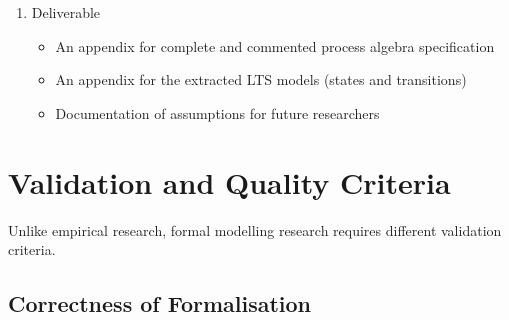 \begin{enumerate}
  Format the complete specification as an appendix with:

  \begin{itemize}
      \item Complete alphabet definition
      \item Complete process algebra terms for \(P_{ICS004}\), \(P_{ICS020}\), and \(P_{Combined}\)
      \item Communication function \(\gamma\) definition
      \item Encapsulation set \(H\) and abstraction set \(I\)
      \item Commentary explaining each part of the specification
  \end{itemize}

  This specification is designed to be reusable for:

  \begin{itemize}
      \item Future comparison with Polkadot XCM
      \item Future comparison with Axelar General Message Passing (GMP)
      \item Input to automated process algebra tools (mCRL2, CADP, or similar)
  \end{itemize}
\item
  Deliverable

  \begin{itemize}
      \item An appendix for complete and commented process algebra specification
      \item An appendix for the extracted LTS models (states and transitions)
      \item Documentation of assumptions for future researchers
  \end{itemize}
\end{enumerate}

\section{Validation and Quality
Criteria}\label{validation-and-quality-criteria}

Unlike empirical research, formal modelling research requires different
validation criteria.

\subsection{Correctness of
Formalisation}\label{correctness-of-formalisation}

